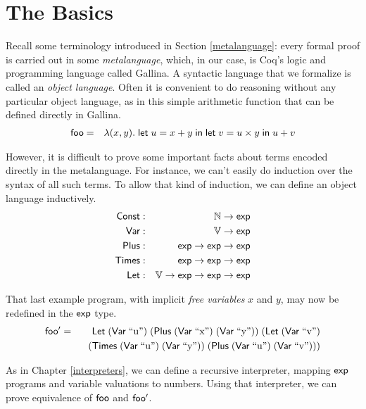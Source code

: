 \documentclass{amsbook}
\theoremstyle{definition}
\theoremstyle{remark}
\numberwithin{section}{chapter}
\numberwithin{equation}{chapter}
\begin{document}
\section{The Basics}\label{mixed}

Recall some terminology introduced in Section \ref{metalanguage}: every formal proof is carried out in some \emph{metalanguage}, which, in our case, is Coq's logic and programming language called Gallina.
A syntactic language that we formalize is called an \emph{object language}.
Often it is convenient to do reasoning without any particular object language, as in this simple arithmetic function that can be defined directly in Gallina.
\begin{eqnarray*}
  \mathsf{foo} &=& \lambda(x, y). \; \mathsf{let} \; u = x + y \; \mathsf{in} \; \mathsf{let} \; v = u \times y \; \mathsf{in} \; u + v
\end{eqnarray*}

However, it is difficult to prove some important facts about terms encoded directly in the metalanguage.
For instance, we can't easily do induction over the syntax of all such terms.
To allow that kind of induction, we can define an object language inductively.
\encoding
\begin{eqnarray*}
  \mathsf{Const} &:& \mathbb N \to \mathsf{exp} \\
  \mathsf{Var} &:& \mathbb V \to \mathsf{exp} \\
  \mathsf{Plus} &:& \mathsf{exp} \to \mathsf{exp} \to \mathsf{exp} \\
  \mathsf{Times} &:& \mathsf{exp} \to \mathsf{exp} \to \mathsf{exp} \\
  \mathsf{Let} &:& \mathbb V \to \mathsf{exp} \to \mathsf{exp} \to \mathsf{exp}
\end{eqnarray*}

That last example program, with implicit \emph{free variables} $x$ and $y$, may now be redefined in the $\mathsf{exp}$ type.
\newcommand{\var}[1]{\mt{Var} \; \textrm{``#1''}}
\begin{eqnarray*}
  \mt{foo'} &=& \mt{Let} \; (\var{u}) \; (\mt{Plus} \; (\var{x}) \; (\var{y})) \; (\mt{Let} \; (\var{v}) \\
  && \hspace{.1in} (\mt{Times} \; (\var{u}) \; (\var{y})) \; (\mt{Plus} \; (\var{u}) \; (\var{v})))
\end{eqnarray*}

As in Chapter \ref{interpreters}, we can define a recursive interpreter, mapping $\mathsf{exp}$ programs and variable valuations to numbers.
Using that interpreter, we can prove equivalence of $\mathsf{foo}$ and $\mathsf{foo'}$.
\end{document}
